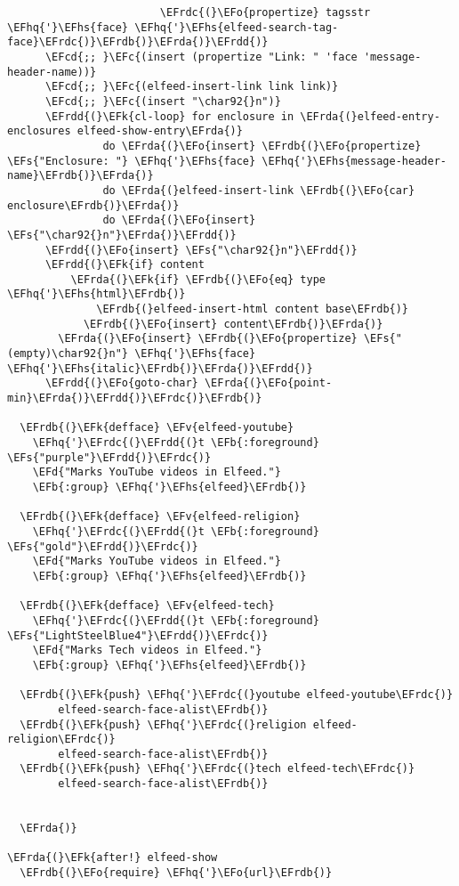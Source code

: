 \documentclass[a4wide,10pt]{article}
\newcommand{\EFc}[1]{\textcolor{EFc}{#1}} %
\newcommand{\EFcd}[1]{\textcolor{EFcd}{#1}} %
\newcommand{\EFs}[1]{\textcolor{EFs}{#1}} %
\newcommand{\EFd}[1]{\textcolor{EFd}{#1}} %
\newcommand{\EFk}[1]{\textcolor{EFk}{#1}} %
\newcommand{\EFb}[1]{\textcolor{EFb}{#1}} %
\newcommand{\EFv}[1]{\textcolor{EFv}{#1}} %
\newcommand{\EFo}[1]{\textcolor{EFo}{#1}} %
\newcommand{\EFhq}[1]{\textcolor{EFhq}{#1}} %
\newcommand{\EFhs}[1]{\textcolor{EFhs}{#1}} %
\newcommand{\EFrda}[1]{\textcolor{EFrda}{#1}} %
\newcommand{\EFrdb}[1]{\textcolor{EFrdb}{#1}} %
\newcommand{\EFrdc}[1]{\textcolor{EFrdc}{#1}} %
\newcommand{\EFrdd}[1]{\textcolor{EFrdd}{#1}} %
\begin{document}
\begin{Code}
\begin{Verbatim}
                        \EFrdc{(}\EFo{propertize} tagsstr \EFhq{'}\EFhs{face} \EFhq{'}\EFhs{elfeed-search-tag-face}\EFrdc{)}\EFrdb{)}\EFrda{)}\EFrdd{)}
      \EFcd{;; }\EFc{(insert (propertize "Link: " 'face 'message-header-name))}
      \EFcd{;; }\EFc{(elfeed-insert-link link link)}
      \EFcd{;; }\EFc{(insert "\char92{}n")}
      \EFrdd{(}\EFk{cl-loop} for enclosure in \EFrda{(}elfeed-entry-enclosures elfeed-show-entry\EFrda{)}
               do \EFrda{(}\EFo{insert} \EFrdb{(}\EFo{propertize} \EFs{"Enclosure: "} \EFhq{'}\EFhs{face} \EFhq{'}\EFhs{message-header-name}\EFrdb{)}\EFrda{)}
               do \EFrda{(}elfeed-insert-link \EFrdb{(}\EFo{car} enclosure\EFrdb{)}\EFrda{)}
               do \EFrda{(}\EFo{insert} \EFs{"\char92{}n"}\EFrda{)}\EFrdd{)}
      \EFrdd{(}\EFo{insert} \EFs{"\char92{}n"}\EFrdd{)}
      \EFrdd{(}\EFk{if} content
          \EFrda{(}\EFk{if} \EFrdb{(}\EFo{eq} type \EFhq{'}\EFhs{html}\EFrdb{)}
              \EFrdb{(}elfeed-insert-html content base\EFrdb{)}
            \EFrdb{(}\EFo{insert} content\EFrdb{)}\EFrda{)}
        \EFrda{(}\EFo{insert} \EFrdb{(}\EFo{propertize} \EFs{"(empty)\char92{}n"} \EFhq{'}\EFhs{face} \EFhq{'}\EFhs{italic}\EFrdb{)}\EFrda{)}\EFrdd{)}
      \EFrdd{(}\EFo{goto-char} \EFrda{(}\EFo{point-min}\EFrda{)}\EFrdd{)}\EFrdc{)}\EFrdb{)}

  \EFrdb{(}\EFk{defface} \EFv{elfeed-youtube}
    \EFhq{'}\EFrdc{(}\EFrdd{(}t \EFb{:foreground} \EFs{"purple"}\EFrdd{)}\EFrdc{)}
    \EFd{"Marks YouTube videos in Elfeed."}
    \EFb{:group} \EFhq{'}\EFhs{elfeed}\EFrdb{)}

  \EFrdb{(}\EFk{defface} \EFv{elfeed-religion}
    \EFhq{'}\EFrdc{(}\EFrdd{(}t \EFb{:foreground} \EFs{"gold"}\EFrdd{)}\EFrdc{)}
    \EFd{"Marks YouTube videos in Elfeed."}
    \EFb{:group} \EFhq{'}\EFhs{elfeed}\EFrdb{)}

  \EFrdb{(}\EFk{defface} \EFv{elfeed-tech}
    \EFhq{'}\EFrdc{(}\EFrdd{(}t \EFb{:foreground} \EFs{"LightSteelBlue4"}\EFrdd{)}\EFrdc{)}
    \EFd{"Marks Tech videos in Elfeed."}
    \EFb{:group} \EFhq{'}\EFhs{elfeed}\EFrdb{)}

  \EFrdb{(}\EFk{push} \EFhq{'}\EFrdc{(}youtube elfeed-youtube\EFrdc{)}
        elfeed-search-face-alist\EFrdb{)}
  \EFrdb{(}\EFk{push} \EFhq{'}\EFrdc{(}religion elfeed-religion\EFrdc{)}
        elfeed-search-face-alist\EFrdb{)}
  \EFrdb{(}\EFk{push} \EFhq{'}\EFrdc{(}tech elfeed-tech\EFrdc{)}
        elfeed-search-face-alist\EFrdb{)}


  \EFrda{)}

\EFrda{(}\EFk{after!} elfeed-show
  \EFrdb{(}\EFo{require} \EFhq{'}\EFo{url}\EFrdb{)}


\end{Verbatim}
\end{Code}
\end{document}
